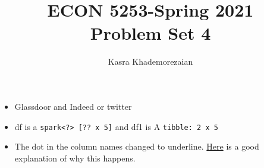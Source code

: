 \documentclass[12pt]{article}
\title{ECON 5253-Spring 2021\\
Problem Set 4}
\author{Kasra Khademorezaian}
\begin{document}
\maketitle
\begin{itemize}
    \item Glassdoor and Indeed or twitter
    \item df is a \verb|spark<?> [?? x 5]| and df1 is A \verb|tibble: 2 x 5|
    \item The dot in the column names changed to underline. \href{https://stackoverflow.com/questions/44367019/column-name-with-dot-spark}{Here} is a good explanation of why this happens.

\end{itemize}
\end{document}
